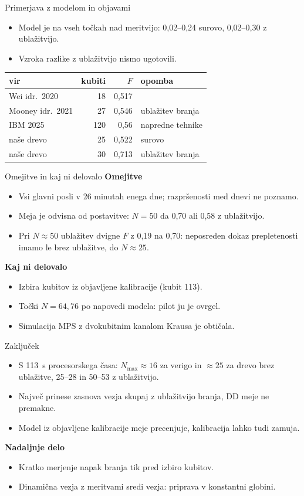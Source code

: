 \documentclass[aspectratio=169,11pt]{beamer}
\begin{document}
\begin{frame}{Primerjava z modelom in objavami}
\begin{itemize}
\item Model je na vseh točkah nad meritvijo: 0,02--0,24 surovo, 0,02--0,30 z ublažitvijo.
\item Vzroka razlike z ublažitvijo nismo ugotovili.
\end{itemize}
\bigskip
\centering
\begin{tabular}{lrrl}
\toprule
vir & kubiti & $F$ & opomba \\
\midrule
Wei idr.\ 2020 & 18 & 0,517 & \\
Mooney idr.\ 2021 & 27 & 0,546 & ublažitev branja \\
IBM 2025 & 120 & 0,56 & napredne tehnike \\
\midrule
naše drevo & 25 & 0,522 & surovo \\
naše drevo & 30 & 0,713 & ublažitev branja \\
\bottomrule
\end{tabular}
\end{frame}

\begin{frame}{Omejitve in kaj ni delovalo}
\textbf{Omejitve}
\begin{itemize}
\item Vsi glavni posli v 26 minutah enega dne; razpršenosti med dnevi ne poznamo.
\item Meja je odvisna od postavitve: $N=50$ da 0,70 ali 0,58 z ublažitvijo.
\item Pri $N\approx50$ ublažitev dvigne $F$ z 0,19 na 0,70: neposreden dokaz prepletenosti imamo le brez ublažitve, do $N\approx25$.
\end{itemize}
\medskip
\textbf{Kaj ni delovalo}
\begin{itemize}
\item Izbira kubitov iz objavljene kalibracije (kubit 113).
\item Točki $N=64, 76$ po napovedi modela: pilot ju je ovrgel.
\item Simulacija MPS z dvokubitnim kanalom Krausa je obtičala.
\end{itemize}
\end{frame}

\begin{frame}{Zaključek}
\begin{itemize}
\item S 113~s procesorskega časa: $N_{\max}\approx16$ za verigo in $\approx25$ za drevo brez ublažitve, 25--28 in 50--53 z ublažitvijo.
\item Največ prinese zasnova vezja skupaj z ublažitvijo branja, DD meje ne premakne.
\item Model iz objavljene kalibracije meje precenjuje, kalibracija lahko tudi zamuja.
\end{itemize}
\bigskip
\textbf{Nadaljnje delo}
\begin{itemize}
\item Kratko merjenje napak branja tik pred izbiro kubitov.
\item Dinamična vezja z meritvami sredi vezja: priprava v konstantni globini.
\end{itemize}
\end{frame}
\end{document}
